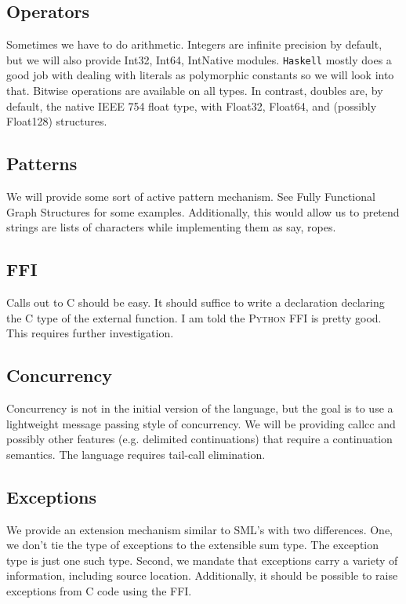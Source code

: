 \documentclass[]{article}
\begin{document}
\subsection{Operators}
Sometimes we have to do arithmetic. Integers are infinite precision by default, but we will also provide Int32, Int64, IntNative modules. \texttt{Haskell} mostly does a good job with dealing with literals as polymorphic constants so we will look into that. Bitwise operations are available on all types. In contrast, doubles are, by default, the native IEEE 754 float type, with Float32, Float64, and (possibly Float128) structures.

\subsection{Patterns}
We will provide some sort of active pattern mechanism. See Fully Functional Graph Structures for some examples. Additionally, this would allow us to pretend strings are lists of characters while implementing them as say, ropes.

\subsection{FFI}
Calls out to C should be easy. It should suffice to write a declaration declaring the C type of the external function. I am told the \textsc{Python} FFI is pretty good. This requires further investigation.

\subsection{Concurrency}
Concurrency is not in the initial version of the language, but the goal is to use a lightweight message passing style of concurrency. We will be providing callcc and possibly other features (e.g. delimited continuations) that require a continuation semantics. The language requires tail-call elimination.

\subsection{Exceptions}
We provide an extension mechanism similar to SML's with two differences. One, we don't tie the type of exceptions to the extensible sum type. The exception type is just one such type. Second, we mandate that exceptions carry a variety of information, including source location. Additionally, it should be possible to raise exceptions from C code using the FFI.
\end{document}
